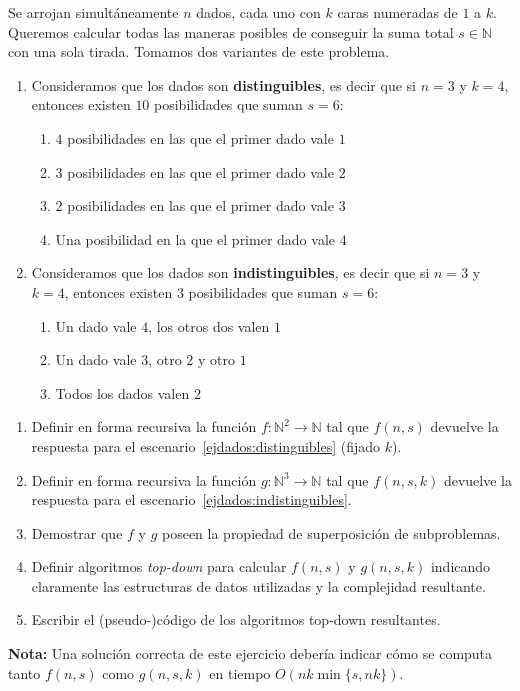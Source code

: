 
\item Se arrojan simultáneamente $n$ dados, cada uno con $k$ caras numeradas de $1$ a $k$. Queremos calcular todas las maneras posibles de conseguir la suma total $s \in \mathbb{N}$ con una sola tirada. Tomamos dos variantes de este problema.

\begin{enumerate}[label=$(\Alph*)$,ref=$(\Alph*)$]
\item Consideramos que los dados son \textbf{distinguibles}, es decir que si $n = 3$ y $k = 4$, entonces existen $10$ posibilidades que suman $s = 6$:
\begin{enumerate}
\item $4$ posibilidades en las que el primer dado vale $1$
\item $3$ posibilidades en las que el primer dado vale $2$
\item $2$ posibilidades en las que el primer dado vale $3$
\item Una posibilidad en la que el primer dado vale $4$
\end{enumerate}\label{ejdados:distinguibles}
\item Consideramos que los dados son \textbf{indistinguibles}, es decir que si $n = 3$ y $k = 4$, entonces existen $3$ posibilidades que suman $s = 6$:
\begin{enumerate}
\item Un dado vale $4$, los otros dos valen $1$
\item Un dado vale $3$, otro $2$ y otro $1$
\item Todos los dados valen $2$
\end{enumerate}\label{ejdados:indistinguibles}
\end{enumerate}

\begin{enumerate}[label=$\alph*)$,ref=$\alph*)$]
  \item Definir en forma recursiva la función $f \colon \mathbb{N}^2 \to \mathbb{N}$ tal que $f(n, s)$ devuelve la respuesta para el escenario~\ref{ejdados:distinguibles} (fijado $k$).
  \item Definir en forma recursiva la función $g \colon \mathbb{N}^3 \to \mathbb{N}$ tal que $f(n, s, k)$ devuelve la respuesta para el escenario~\ref{ejdados:indistinguibles}.
  \item Demostrar que $f$ y $g$ poseen la propiedad de superposición de subproblemas.
  \item Definir algoritmos \textit{top-down} para calcular $f(n, s)$ y $g(n, s, k)$ indicando claramente las estructuras de datos utilizadas y la complejidad resultante.
  \item Escribir el (pseudo-)código de los algoritmos top-down resultantes.
\end{enumerate}
 \textbf{Nota:} Una solución correcta de este ejercicio debería indicar cómo se computa tanto $f(n,s)$ como $g(n,s,k)$ en tiempo $O(nk\min\{s, nk\})$.


